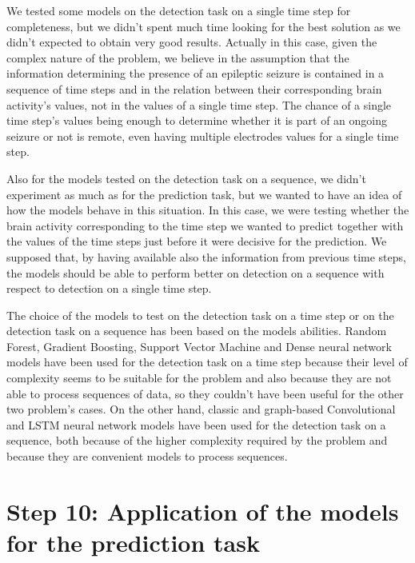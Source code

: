 We tested some models on the detection task on a single time step for completeness, but we didn't spent much time looking for the best solution as we didn't expected to obtain very good results. Actually in this case, given the complex nature of the problem, we believe in the assumption that the information determining the presence of an epileptic seizure is contained in a sequence of time steps and in the relation between their corresponding brain activity's values, not in the values of a single time step. The chance of a single time step's values being enough to determine whether it is part of an ongoing seizure or not is remote, even having multiple electrodes values for a single time step. 

Also for the models tested on the detection task on a sequence, we didn't experiment as much as for the prediction task, but we wanted to have an idea of how the models behave in this situation. In this case, we were testing whether the brain activity corresponding to the time step we wanted to predict together with the values of the time steps just before it were decisive for the prediction. We supposed that, by having available also the information from previous time steps, the models should be able to perform better on detection on a sequence with respect to detection on a single time step.

The choice of the models to test on the detection task on a time step or on the detection task on a sequence has been based on the models abilities. Random Forest, Gradient Boosting, Support Vector Machine and Dense neural network models have been used for the detection task on a time step because their level of complexity seems to be suitable for the problem and also because they are not able to process sequences of data, so they couldn't have been useful for the other two problem's cases. On the other hand, classic and graph-based Convolutional and LSTM neural network models have been used for the detection task on a sequence, both because of the higher complexity required by the problem and because they are convenient models to process sequences.


\section{Step 10: Application of the models for the prediction task} \label{sec: step_models_prediction_task}
